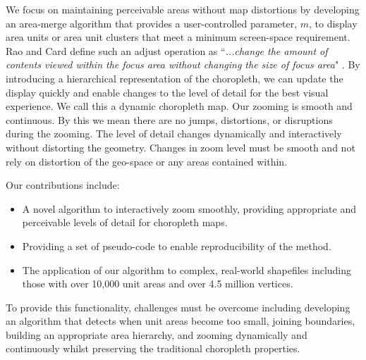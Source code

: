 We focus on maintaining perceivable areas without map distortions by developing an area-merge algorithm that provides a user-controlled parameter, $m$, to display area units or area unit clusters that meet a minimum screen-space requirement. Rao and Card define such an adjust operation as ``\textit{...change the amount of contents viewed within the focus area without changing the size of focus area}" \cite{rao1994table}. By introducing a hierarchical representation of the choropleth, we can update the display quickly and enable changes to the level of detail for the best visual experience. We call this a dynamic choropleth map. Our zooming is smooth and continuous. By this we mean there are no jumps, distortions, or disruptions during the zooming. The level of detail changes dynamically and interactively without distorting the geometry. Changes in zoom level must be smooth and not rely on distortion of the geo-space or any areas contained within.


Our contributions include:
\begin{itemize}
\item A novel algorithm to interactively zoom smoothly, providing appropriate and perceivable levels of detail for choropleth maps.
\item Providing a set of pseudo-code to enable reproducibility of the method.
\item The application of our algorithm to complex, real-world shapefiles including those with over 10,000 unit areas and over 4.5 million vertices.
\end{itemize}
To provide this functionality, challenges must be overcome including developing an algorithm that detects when unit areas become too small, joining boundaries, building an appropriate area hierarchy, and zooming dynamically and continuously whilst preserving the traditional choropleth properties.


